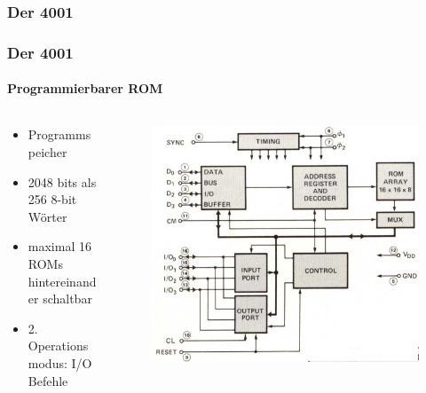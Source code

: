 \subsubsection{Der 4001}
\begin{frame}
	\frametitle{Der 4001}
	\framesubtitle{Programmierbarer ROM}
	\begin{columns}
		\begin{column}{.5\textwidth}	
			\begin{itemize}
				\item Programmspeicher
				\item 2048 bits als 256 8-bit Wörter
				\item maximal 16 ROMs hintereinander schaltbar
				\item 2. Operationsmodus: I/O Befehle
			\end{itemize}
		\end{column}
		\begin{column}{.6\textwidth}
			\begin{figure}[ht]
				\includegraphics[width=1\linewidth]{images/layout_4001.png}
			\end{figure}
		\end{column}
	\end{columns}
\end{frame}

